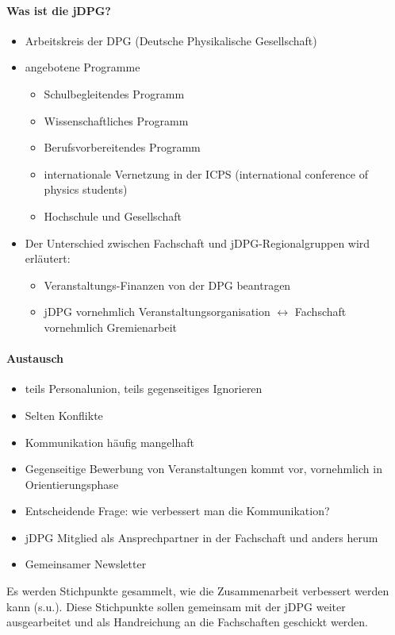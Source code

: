     \paragraph{Was ist die jDPG?}
      \begin{itemize}
        \item Arbeitskreis der DPG (Deutsche Physikalische Gesellschaft)
        \item angebotene Programme
          \begin{itemize}
            \item Schulbegleitendes Programm
            \item Wissenschaftliches Programm
            \item Berufsvorbereitendes Programm
            \item internationale Vernetzung in der ICPS (international conference of physics students)
            \item Hochschule und Gesellschaft
          \end{itemize}
        \item Der Unterschied zwischen Fachschaft und jDPG-Regionalgruppen wird erläutert:
          \begin{itemize}
            \item Veranstaltungs-Finanzen von der DPG beantragen
            \item jDPG vornehmlich Veranstaltungsorganisation $\leftrightarrow$ Fachschaft vornehmlich Gremienarbeit
          \end{itemize}
      \end{itemize}

    \paragraph{Austausch}
      \begin{itemize}
        \item teils Personalunion, teils gegenseitiges Ignorieren
        \item Selten Konflikte
        \item Kommunikation häufig mangelhaft
        \item Gegenseitige Bewerbung von Veranstaltungen kommt vor, vornehmlich in Orientierungsphase
        \item Entscheidende Frage: wie verbessert man die Kommunikation?
        \item jDPG Mitglied als Ansprechpartner in der Fachschaft und anders herum
        \item Gemeinsamer Newsletter
      \end{itemize}
      Es werden Stichpunkte gesammelt, wie die Zusammenarbeit verbessert werden kann (s.u.). Diese Stichpunkte sollen gemeinsam mit der jDPG weiter ausgearbeitet und als Handreichung an die Fachschaften geschickt werden.

